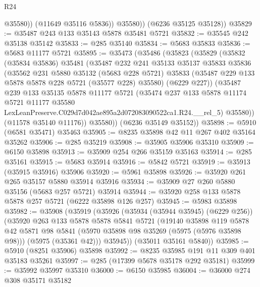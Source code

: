 \begin{lexlean}{R24}
\begin{coremodule}
                @35580))
            (@11649 @35116 @5836))
          @35580))
      (@6236 @35125 @35128))
@35829 := @35487 @243 @133 @35143 @5878 @35481 @5721
@35832 := @35545 @242 @35138 @35142
@35833 := @285 @35140
@35834 := @5683 @35833
@35836 := @5683 @11177 @5721
@35895 := @35473
    (@35486
      (@35823
        (@35829
          (@35832
            (@35834 @35836)
            @35481
            (@35487
              @232
              @241
              @35133
              @35137
              @35833
              @35836
              (@35562
                @231
                @5880
                @35132
                (@5683 @228 @5721)
                @35833
                (@35487 @229 @133 @5878 @5878 @228 @5721 (@35577 @228) @35580)
                (@6229 @227))
              (@35487
                @239
                @133
                @35135
                @5878
                @11177
                @5721
                (@35474
                  @237
                  @133
                  @5878
                  @11174
                  @5721
                  @11177
                  @35580
                  LexLeanPreserve.C029d7d042ae895a2d072083090522ca1.R24.__rel_5)
                @35580))
            (@11578 @35140 @11176))
          @35580))
      (@6236 @35149 @35152))
@35898 := @5910 (@6581 @35471) @35463
@35905 := @8235 @35898 @42 @11 @267 @402 @35164 @35262
@35906 := @285 @35219
@35908 := @35905 @35906 @35310
@35909 := @6150 @35898
@35913 := @35909 @254 @266 @35159 @35163
@35914 := @285 @35161
@35915 := @5683 @35914
@35916 := @5842 @5721
@35919 := @35913 (@35915 @35916) @35906
@35920 := @5961 @35898
@35926 := @35920 @261 @265 @35157 @5880 @35914 @35916
@35934 := @35909 @27 @260 @5880 @35156 (@5683 @257 @5721) @35914
@35944 := @35920 @258 @133 @5878 @5878 @257 @5721 (@6222 @35898 @126 @257)
@35945 := @5983 @35898
@35982 := @35908
    (@35919
      (@35926
        (@35934 (@35944 @35945) (@6229 @256))
        (@35920
          @263
          @133
          @5878
          @5878
          @5841
          @5721
          (@19140
            @35898
            @119
            @5878
            @42
            @5871
            @98
            @5841
            (@5970 @35898 @98 @35269 (@5975 (@5976 @35898 @98)))
            (@5975 (@35361 @42)))
          @35945))
      (@35011 @35161 @5840))
@35985 := @5910 (@8251 @35906) @35898
@35992 := @8235 @35985 @191 @11 @309 @401 @35183 @35261
@35997 := @285 (@17399 @5678 @35178 @292 @35181)
@35999 := @35992 @35997 @35310
@36000 := @6150 @35985
@36004 := @36000 @274 @308 @35171 @35182

\end{coremodule}
\end{lexlean}
